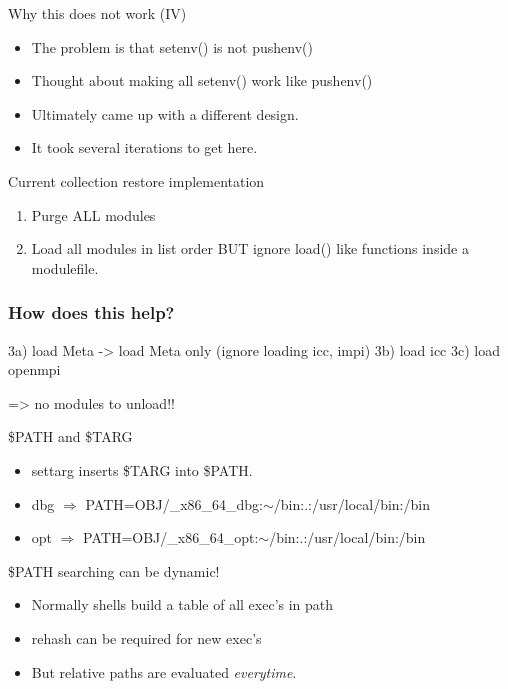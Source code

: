 \documentclass{beamer}
\begin{document}
\begin{frame}{Why this does not work (IV)}
  \begin{itemize}
    \item The problem is that setenv() is not pushenv()
    \item Thought about making all setenv() work like pushenv()
    \item Ultimately came up with a different design. 
    \item It took several iterations to get here.
  \end{itemize}
\end{frame}

\begin{frame}{Current collection restore implementation}
  \begin{enumerate}
    \item Purge ALL modules
    \item Load all modules in list order BUT ignore load() like
      functions inside a modulefile.
  \end{enumerate}
\end{frame}

\begin{frame}[fragile]
  \frametitle{How does this help?}
    {\small
\begin{semiverbatim}
   
   3a) load Meta -> load Meta only (ignore loading icc, impi)
   3b) load icc
   3c) load openmpi

=> no modules to unload!!
\end{semiverbatim}
    }
\end{frame}

\begin{frame}{\$PATH and \$TARG}
  \begin{itemize}
    \item settarg inserts \$TARG into \$PATH.
    \item dbg $\Rightarrow$ PATH=OBJ/\_x86\_64\_dbg:$\sim$/bin:.:/usr/local/bin:/bin
    \item opt $\Rightarrow$ PATH=OBJ/\_x86\_64\_opt:$\sim$/bin:.:/usr/local/bin:/bin
  \end{itemize}
\end{frame}

\begin{frame}{\$PATH searching can be dynamic!}
  \begin{itemize}
    \item Normally shells build a table of all exec's in path
    \item rehash can be required for new exec's
    \item But relative paths are evaluated \emph{everytime}.
  \end{itemize}
\end{frame}
\end{document}
